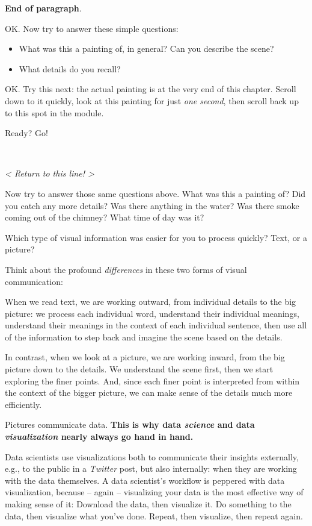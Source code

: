 \documentclass[]{book}
\begin{document}
\textbf{End of paragraph}.

OK. Now try to answer these simple questions:

\begin{itemize}
\item
  What was this a painting of, in general? Can you describe the scene?
\item
  What details do you recall?
\end{itemize}

OK. Try this next: the actual painting is at the very end of this chapter. Scroll down to it quickly, look at this painting for just \emph{one second}, then scroll back up to this spot in the module.

Ready? Go!

~

\emph{\textless{} Return to this line! \textgreater{}}

Now try to answer those same questions above. What was this a painting of? Did you catch any more details? Was there anything in the water? Was there smoke coming out of the chimney? What time of day was it?

Which type of visual information was easier for you to process quickly? Text, or a picture?

Think about the profound \emph{differences} in these two forms of visual communication:

When we read text, we are working outward, from individual details to the big picture: we process each individual word, understand their individual meanings, understand their meanings in the context of each individual sentence, then use all of the information to step back and imagine the scene based on the details.

In contrast, when we look at a picture, we are working inward, from the big picture down to the details. We understand the scene first, then we start exploring the finer points. And, since each finer point is interpreted from within the context of the bigger picture, we can make sense of the details much more efficiently.

Pictures communicate data. \textbf{This is why data \emph{science} and data \emph{visualization} nearly always go hand in hand.}

Data scientists use visualizations both to communicate their insights externally, e.g., to the public in a \emph{Twitter} post, but also internally: when they are working with the data themselves. A data scientist's workflow is peppered with data visualization, because -- again -- visualizing your data is the most effective way of making sense of it: Download the data, then visualize it. Do something to the data, then visualize what you've done. Repeat, then visualize, then repeat again.
\end{document}
